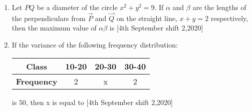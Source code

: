 \documentclass[journal]{IEEEtran}
\begin{document}
\begin{enumerate}[start=16]
\item Let $PQ$ be a diameter of the circle $x^2+y^2=9$. If $\alpha$ and $\beta$ are the lengths of the perpendiculars from $\vec{P}$ and $\vec{Q}$ on the straight line, $x+y=2$ respectively, then the maximum value of $\alpha\beta$ is \underline{\hspace{1cm}} \hfill{[4th September shift 2,2020]}\\

\item If the variance of the following frequency distribution:

\begin{center}
\begin{tabular}{|c|c|c|c|}
\hline
\textbf{Class}     & 10-20 & 20-30 & 30-40 \\
\hline
\textbf{Frequency} & 2     & x     & 2     \\
\hline
\end{tabular}
\end{center}

is $50$, then  x is equal to \underline{\hspace{1cm}} \hfill{[4th September shift 2,2020]}



\end{enumerate}
\end{document}
